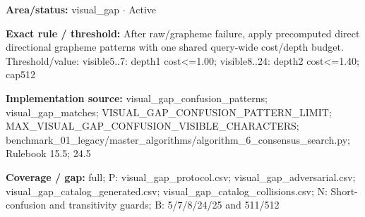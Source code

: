 \begin{tcolorbox}[enhanced,breakable,colback=white,colframe=Muted!45,boxrule=0.45pt,arc=1.5pt,left=6pt,right=6pt,top=5pt,bottom=5pt,title={\texttt{VG-DIRECT-STAGE-09}},title after break={\texttt{VG-DIRECT-STAGE-09}\ (continued)},fonttitle=\headingfont\bfseries\color{Navy},coltitle=Navy]
\textbf{Area/status:} visual\_\allowbreak{}gap $\boldsymbol{\cdot}$ Active\par
\smallskip
\textbf{Exact rule / threshold:} After raw/\allowbreak{}grapheme failure, apply precomputed direct directional grapheme patterns with one shared query-wide cost/\allowbreak{}depth budget. Threshold/\allowbreak{}value: visible5..7: depth1 cost<=1.00; visible8..24: depth2 cost<=1.40; cap512\par
\smallskip
\textbf{Implementation source:} visual\_\allowbreak{}gap\_\allowbreak{}confusion\_\allowbreak{}patterns; visual\_\allowbreak{}gap\_\allowbreak{}matches; VISUAL\_\allowbreak{}GAP\_\allowbreak{}CONFUSION\_\allowbreak{}PATTERN\_\allowbreak{}LIMIT; MAX\_\allowbreak{}VISUAL\_\allowbreak{}GAP\_\allowbreak{}CONFUSION\_\allowbreak{}VISIBLE\_\allowbreak{}CHARACTERS; benchmark\_\allowbreak{}01\_\allowbreak{}legacy/\allowbreak{}master\_\allowbreak{}algorithms/\allowbreak{}algorithm\_\allowbreak{}6\_\allowbreak{}consensus\_\allowbreak{}search.py; Rulebook 15.5; 24.5\par
\smallskip
\textbf{Coverage / gap:} full; P: visual\_\allowbreak{}gap\_\allowbreak{}protocol.csv; visual\_\allowbreak{}gap\_\allowbreak{}adversarial.csv; visual\_\allowbreak{}gap\_\allowbreak{}catalog\_\allowbreak{}generated.csv; visual\_\allowbreak{}gap\_\allowbreak{}catalog\_\allowbreak{}collisions.csv; N: Short-confusion and transitivity guards; B: 5/\allowbreak{}7/\allowbreak{}8/\allowbreak{}24/\allowbreak{}25 and 511/\allowbreak{}512
\end{tcolorbox}
